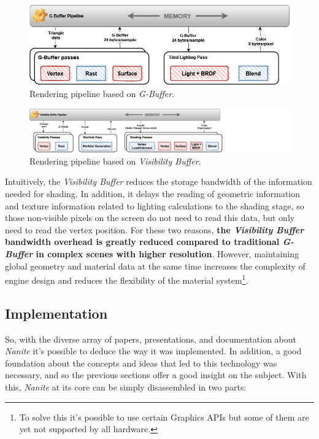 \documentclass[10pt,journal,compsoc]{IEEEtran}
\begin{document}
\begin{figure}[H]
    \centering
    \includegraphics[scale=0.25]{img/pl1.png}
    \caption{Rendering pipeline based on \textit{G-Buffer}.}
    \label{fig:pl1}
\end{figure}

\begin{figure}[H]
    \centering
    \includegraphics[scale=0.25]{img/pl2.png}
    \caption{Rendering pipeline based on \textit{Visibility Buffer}.}
    \label{fig:pl2}
\end{figure}

Intuitively, the \textit{Visibility Buffer} reduces the storage bandwidth of the information needed for shading. In addition, it delays the reading of geometric information and texture information related to lighting calculations to the shading stage, so those non-visible pixels on the screen do not need to read this data, but only need to read the vertex position. For these two reasons, \textbf{the \textit{Visibility Buffer} bandwidth overhead is greatly reduced compared to traditional \textit{G-Buffer} in complex scenes with higher resolution}. However, maintaining global geometry and material data at the same time increases the complexity of engine design and reduces the flexibility of the material system\footnote{To solve this it's possible to use certain Graphics APIs but some of them are yet not supported by all hardware.}.

\subsection{Implementation}

\par So, with the diverse array of papers, presentations, and documentation about \textit{Nanite} it's possible to deduce the way it was implemented. In addition, a good foundation about the concepts and ideas that led to this technology was necessary, and so the previous sections offer a good insight on the subject. With this, \textit{Nanite} at its core can be simply disassembled in two parts:
\end{document}

